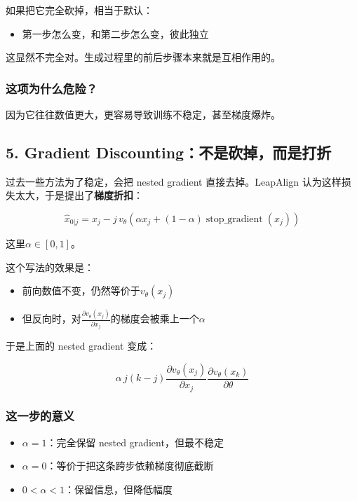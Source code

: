 如果把它完全砍掉，相当于默认：

\begin{itemize}[leftmargin=1.5em]
  \item 第一步怎么变，和第二步怎么变，彼此独立
\end{itemize}

这显然不完全对。生成过程里的前后步骤本来就是互相作用的。

\subsubsection{这项为什么危险？}

因为它往往数值更大，更容易导致训练不稳定，甚至梯度爆炸。

\subsection{5. Gradient Discounting：不是砍掉，而是打折}

过去一些方法为了稳定，会把 nested gradient 直接去掉。LeapAlign 认为这样损失太大，于是提出了\textbf{梯度折扣}：

\[
\hat{x}_{0|j}
=
x_j
- j\, v_\theta\!\left(
\alpha x_j + (1-\alpha)\operatorname{stop\_gradient}(x_j)
\right)
\]

这里$\alpha \in [0,1]$。

这个写法的效果是：

\begin{itemize}[leftmargin=1.5em]
  \item 前向数值不变，仍然等价于$v_\theta(x_j)$
  \item 但反向时，对$\frac{\partial v_\theta(x_j)}{\partial x_j}$的梯度会被乘上一个$\alpha$
\end{itemize}

于是上面的 nested gradient 变成：

\[
\alpha\, j(k-j)
\frac{\partial v_\theta(x_j)}{\partial x_j}
\frac{\partial v_\theta(x_k)}{\partial \theta}
\]

\subsubsection{这一步的意义}

\begin{itemize}[leftmargin=1.5em]
  \item $\alpha = 1$：完全保留 nested gradient，但最不稳定
  \item $\alpha = 0$：等价于把这条跨步依赖梯度彻底截断
  \item $0 < \alpha < 1$：保留信息，但降低幅度
\end{itemize}

